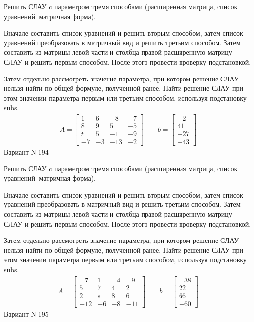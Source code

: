 \documentclass[11pt]{report}
\begin{document}
Решить СЛАУ c параметром тремя способами (расширенная матрица, список уравнений, матричная форма).

Вначале составить список уравнений и решить вторым способом,
затем список уравнений преобразовать в матричный вид и решить третьим способом.
Затем составить из матрицы левой части и столбца правой расширенную матрицу СЛАУ и решить первым способом.
После этого провести проверку подстановкой.

Затем отдельно рассмотреть значение параметра, при котором решение СЛАУ нельзя найти по общей формуле,
полученной ранее.
Найти решение СЛАУ при этом значении параметра первым или третьим способом, используя подстановку subs.
\begin{align*}
    A = \left[\begin{matrix}1 & 6 & -8 & -7\\8 & 9 & 5 & -5\\t & 5 & -1 & -9\\-7 & -3 & -13 & -2\end{matrix}\right]
\qquad b = \left[\begin{matrix}-2\\41\\-27\\-43\end{matrix}\right]
\end{align*}
\newpage
Вариант N 194


Решить СЛАУ c параметром тремя способами (расширенная матрица, список уравнений, матричная форма).

Вначале составить список уравнений и решить вторым способом,
затем список уравнений преобразовать в матричный вид и решить третьим способом.
Затем составить из матрицы левой части и столбца правой расширенную матрицу СЛАУ и решить первым способом.
После этого провести проверку подстановкой.

Затем отдельно рассмотреть значение параметра, при котором решение СЛАУ нельзя найти по общей формуле,
полученной ранее.
Найти решение СЛАУ при этом значении параметра первым или третьим способом, используя подстановку subs.
\begin{align*}
    A = \left[\begin{matrix}-7 & 1 & -4 & -9\\5 & 7 & 4 & 2\\2 & s & 8 & 6\\-12 & -6 & -8 & -11\end{matrix}\right]
\qquad b = \left[\begin{matrix}-38\\22\\66\\-60\end{matrix}\right]
\end{align*}
\newpage
Вариант N 195
\end{document}
